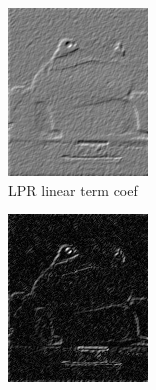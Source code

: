 \documentclass{article}
\begin{document}
\begin{figure}[htb]
  \centering
  \begin{subfigure}[b]{0.24\linewidth}
    \includegraphics[width=\linewidth]{images/edge_1.png}
    \caption{LPR linear term coef}
  \end{subfigure}
  \begin{subfigure}[b]{0.24\linewidth}
    \includegraphics[width=\linewidth]{images/edge_2.png}

\end{subfigure}
\end{figure}
\end{document}
